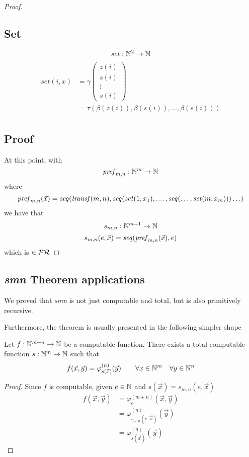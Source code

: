 \begin{theorem}
\begin{proof}
\subsection*{Set}
    \newcommand{\set}[1]{\ensuremath{\mathit{set}({#1})}}
    \[
      \mathit{set} : \mathbb{N}^2 \rightarrow \mathbb{N}
    \]
\begin{align*}
  \set{i,x} &= \gamma\left( \begin{array}{c}
    z(i) \\
    s(i) \\
    \vdots \\
    s(i)
  \end{array} \right) \\
&= \tau(\beta(z(i)), \beta(s(i)), \dots, \beta(s(i))) \\
\end{align*}

\subsection*{Proof}
    At this point, with
    \newcommand{\pref}[1]{\ensuremath{\mathit{pref}_{m,n}({#1})}}
    \[
      \mathit{pref}_{m,n}: \mathbb{N}^m \rightarrow \mathbb{N}
    \]
where
    \[
      \pref{\vec{x}} = \seq{\tran{m,n}, \seq{\set{1,x_1},\dots, \seq{\dots , \set{m,x_m}}} \dots}
    \]
    we have that
    \[
      s_{m,n}: \mathbb{N}^{m+1} \rightarrow \mathbb{N}
    \]
    \[
      s_{m,n}(e, \vec{x}) = \seq{\pref{\vec{x}}, e}
    \]
    which is $\in \mathcal{PR}$
  \end{proof}
\end{theorem}

\subsection*{\emph{smn} Theorem applications}
\begin{observation}
  We proved that \emph{smn} is not just computable and total,
but is also primitively recursive. 
\end{observation}

Furthermore, the theorem is usually presented
in the following simpler shape
\begin{corollary}\label{corollary:simple-smn}
  Let $f: \mathbb{N}^{m+n} \rightarrow \mathbb{N}$ be a computable function. There
  exists a total computable function $s: \mathbb{N}^m\rightarrow \mathbb{N}$ such that
  \[
    f(\vec{x}, \vec{y}) = \varphi_{s(\vec{x})}^{(n)}(\vec{y}) \quad \quad
    \forall x \in \mathbb{N}^m \quad \forall y \in \mathbb{N}^n
  \]
  \begin{proof}
    Since $f$ is computable, given $e \in \mathbb{N}$ and $s(\vec{x}) = s_{m,n}(e, \vec{x})$
    \begin{align*}
      f(\vec{x}, \vec{y}) &= \varphi_e^{(m+n)}(\vec{x}, \vec{y}) \\
      &= \varphi_{s_{m,n}(e, \vec{x})}^{(n)}(\vec{y})\\
      &= \varphi_{s(\vec{x})}^{(n)}(\vec{y})
    \end{align*}
  \end{proof}
\end{corollary}

